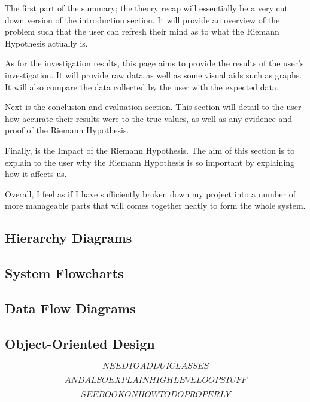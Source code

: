 \documentclass{article}
\begin{document}
The first part of the summary; the theory recap will essentially be a very cut down version of the introduction section. It will provide an overview of the problem such that the user can refresh their mind as to what the Riemann Hypothesis actually is.

As for the investigation results, this page aims to provide the results of the user's investigation. It will provide raw data as well as some visual aids such as graphs. It will also compare the data collected by the user with the expected data.

Next is the conclusion and evaluation section. This section will detail to the user how accurate their results were to the true values, as well as any evidence and proof of the Riemann Hypothesis.

Finally, is the Impact of the Riemann Hypothesis. The aim of this section is to explain to the user why the Riemann Hypothesis is so important by explaining how it affects us.


Overall, I feel as if I have sufficiently broken down my project into a number of more manageable parts that will comes together neatly to form the whole system.
\subsection{Hierarchy Diagrams}

\subsection{System Flowcharts}

\subsection{Data Flow Diagrams}

\clearpage
\subsection{Object-Oriented Design}

$$NEED TO ADD UI CLASSES$$

$$ AND ALSO EXPLAIN HIGH LEVEL OOP STUFF$$

$$SEE BOOK ON HOW TO DO PROPERLY$$
\end{document}

